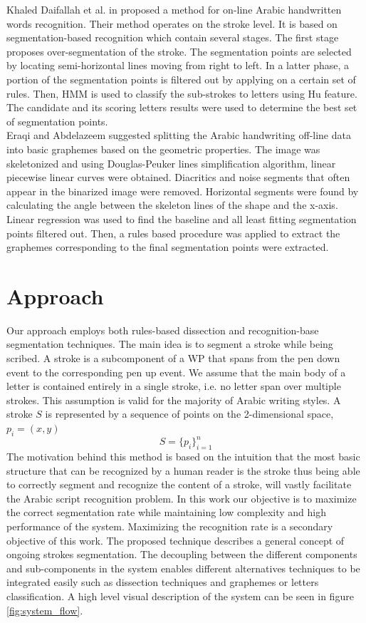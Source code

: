 \documentclass[journal,compsoc]{IEEEtran}
\begin{document}
Khaled Daifallah et al. in \cite{daifallah2009recognition} proposed a method for on-line Arabic handwritten words recognition. Their method operates on the stroke level. It is based on segmentation-based recognition which contain several stages. The first stage proposes over-segmentation of the stroke. The segmentation points are selected by locating semi-horizontal lines moving from right to left. In a latter phase, a portion of the segmentation points is filtered out by applying on a certain set of rules. Then, HMM is used to classify the sub-strokes to letters using Hu feature. The candidate and its scoring letters results were used to determine the best set of segmentation points. \\

Eraqi and Abdelazeem \cite{eraqi2012new} suggested splitting the Arabic handwriting off-line data into basic graphemes based on the geometric properties. The image was skeletonized and using Douglas-Peuker lines simplification algorithm, linear piecewise linear curves were obtained. Diacritics and noise segments that often appear in the binarized image were removed. Horizontal segments were found by calculating the angle between the skeleton lines of the shape and the x-axis. Linear regression was used to find the baseline and all least fitting segmentation points filtered out. Then, a rules based procedure was applied to extract the graphemes corresponding to the final segmentation points were extracted.    

\section{Approach}
\label{sec:approach}
Our approach employs both rules-based dissection and recognition-base segmentation techniques. The main idea is to segment a stroke while being scribed. A stroke is a subcomponent of a WP that spans from the pen down event to the corresponding pen up event. We assume that the main body of a letter is contained entirely in a single stroke, i.e. no letter span over multiple strokes. This assumption is valid for the majority of Arabic writing styles. 
A stroke $S$ is represented by a sequence of points on the 2-dimensional space, $p_{i}=(x,y)$ 
\begin{equation}
S=\{p_{i}\}_{i=1}^{n}
\end{equation}
The motivation behind this method is based on the intuition that the most basic structure that can be recognized by a human reader is the stroke thus being able to correctly segment and recognize the content of a stroke, will vastly facilitate the Arabic script recognition problem. In this work our objective is to maximize the correct segmentation rate while maintaining low complexity and high performance of the system. Maximizing the recognition rate is a secondary objective of this work. 
The proposed technique describes a general concept of ongoing strokes segmentation. The decoupling between the different components and sub-components in the system enables different alternatives techniques to be integrated easily such as dissection techniques and graphemes or letters classification. A high level visual description of the system can be seen in figure \ref{fig:system_flow}.\\
\end{document}
